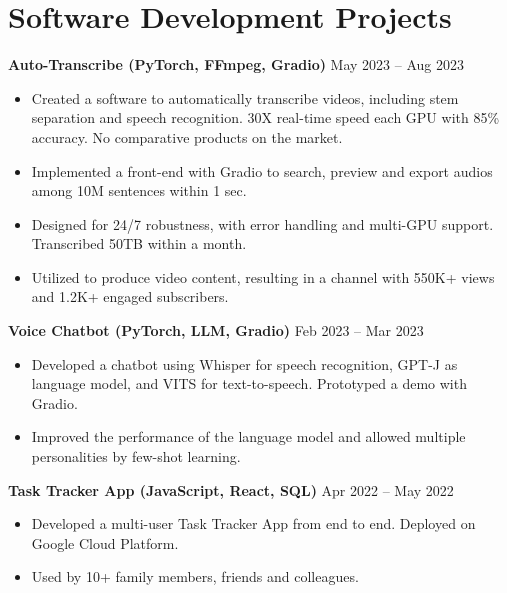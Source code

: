 \documentclass[letterpaper,12pt]{article}
\newenvironment{zitemize}{
\begin{itemize} \vspace{-.8em}\itemsep 0pt \parskip 0pt}
{\end{itemize}\vspace{-.7em}}
\newcommand{\proglang}[1]{#1}
\begin{document}
\section{Software Development Projects}
\textbf{Auto-Transcribe (PyTorch, FFmpeg, Gradio)} \hfill May 2023 -- Aug 2023 \\
\begin{zitemize}
    \item Created a software to automatically transcribe videos, including stem separation and speech recognition. 30X real-time speed each GPU with 85\% accuracy. No comparative products on the market.
    \item Implemented a front-end with \proglang{Gradio} to search, preview and export audios among 10M sentences within 1 sec.
    \item Designed for 24/7 robustness, with error handling and multi-GPU support. Transcribed 50TB within a month.
    \item Utilized to produce video content, resulting in a channel with 550K+ views and 1.2K+ engaged subscribers.
\end{zitemize}

\textbf{Voice Chatbot (PyTorch, LLM, Gradio)} \hfill Feb 2023 -- Mar 2023 \\
\begin{zitemize}
    \item Developed a chatbot using \proglang{Whisper} for speech recognition, \proglang{GPT-J} as language model, and \proglang{VITS} for text-to-speech. Prototyped a demo with \proglang{Gradio}.
    \item Improved the performance of the language model and allowed multiple personalities by few-shot learning.
\end{zitemize}

\textbf{Task Tracker App (JavaScript, React, SQL)} \hfill Apr 2022 -- May 2022 \\
\begin{zitemize}
    \item Developed a multi-user Task Tracker App from end to end. Deployed on \proglang{Google Cloud Platform}.
    \item Used by 10+ family members, friends and colleagues.
\end{zitemize}
\end{document}
